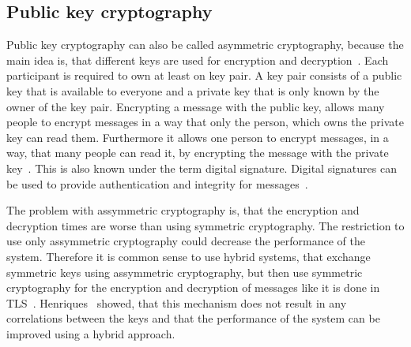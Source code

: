 \subsection{Public key cryptography}
Public key cryptography can also be called asymmetric cryptography, because the main idea is, that different keys are used for encryption and decryption~\cite{anderson2020security}.
Each participant is required to own at least on key pair.
A key pair consists of a public key that is available to everyone and a private key that is only known by the owner of the key pair.
Encrypting a message with the public key, allows many people to encrypt messages in a way that only the person, which owns the private key can read them.
Furthermore it allows one person to encrypt messages, in a way, that many people can read it, by encrypting the message with the private key~\cite{henriques2017using}.
This is also known under the term digital signature. 
Digital signatures can be used to provide authentication and integrity for messages~\cite{anderson2020security}.


The problem with assymmetric cryptography is, that the encryption and decryption times are worse than using symmetric cryptography.
The restriction to use only assymmetric cryptography could decrease the performance of the system.
Therefore it is common sense to use hybrid systems, that exchange symmetric keys using assymmetric cryptography, but then use symmetric cryptography for the encryption and decryption of messages like it is done in TLS~\cite{henriques2017using}.
Henriques~\cite{henriques2017using} showed, that this mechanism does not result in any correlations between the keys and that the performance of the system can be improved using a hybrid approach.

